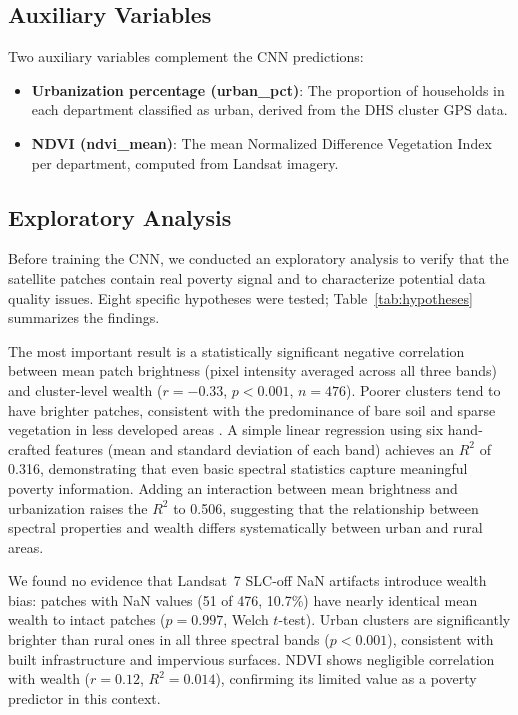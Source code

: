 \documentclass[11pt,a4paper]{article}
\newcommand{\Rtwo}{\ensuremath{R^2}}
\begin{document}
\subsection{Auxiliary Variables}
Two auxiliary variables complement the CNN predictions:
\begin{itemize}
    \item \textbf{Urbanization percentage (urban\_pct)}: The proportion of households in each department classified as urban, derived from the DHS cluster GPS data.
    \item \textbf{NDVI (ndvi\_mean)}: The mean Normalized Difference Vegetation Index per department, computed from Landsat imagery.
\end{itemize}

\subsection{Exploratory Analysis}
\label{sec:exploratory}

Before training the CNN, we conducted an exploratory analysis to verify that the satellite patches contain real poverty signal and to characterize potential data quality issues. Eight specific hypotheses were tested; Table~\ref{tab:hypotheses} summarizes the findings.

The most important result is a statistically significant negative correlation between mean patch brightness (pixel intensity averaged across all three bands) and cluster-level wealth ($r = -0.33$, $p < 0.001$, $n = 476$). Poorer clusters tend to have brighter patches, consistent with the predominance of bare soil and sparse vegetation in less developed areas \citep{jean2016}. A simple linear regression using six hand-crafted features (mean and standard deviation of each band) achieves an \Rtwo{} of 0.316, demonstrating that even basic spectral statistics capture meaningful poverty information. Adding an interaction between mean brightness and urbanization raises the \Rtwo{} to 0.506, suggesting that the relationship between spectral properties and wealth differs systematically between urban and rural areas.

We found no evidence that Landsat~7 SLC-off NaN artifacts introduce wealth bias: patches with NaN values (51 of 476, 10.7\%) have nearly identical mean wealth to intact patches ($p = 0.997$, Welch $t$-test). Urban clusters are significantly brighter than rural ones in all three spectral bands ($p < 0.001$), consistent with built infrastructure and impervious surfaces. NDVI shows negligible correlation with wealth ($r = 0.12$, $R^2 = 0.014$), confirming its limited value as a poverty predictor in this context.
\end{document}
